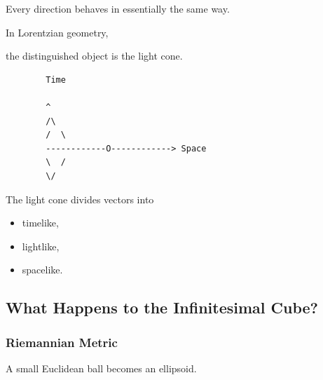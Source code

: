 \documentclass[12pt,a4paper]{article}
\theoremstyle{notespace}
\begin{document}
Every direction behaves in essentially the same way.


In Lorentzian geometry,

the distinguished object is the light cone.

\bigskip

\begin{center}
	\begin{verbatim}
		Time
		
		^
		/\
		/  \
		------------O------------> Space
		\  /
		\/
	\end{verbatim}
\end{center}

The light cone divides vectors into

\begin{itemize}
	\item timelike,
	\item lightlike,
	\item spacelike.
\end{itemize}


\subsection{What Happens to the Infinitesimal Cube?}

\subsubsection*{Riemannian Metric}

A small Euclidean ball becomes an ellipsoid.

\bigskip

\begin{center}
\end{center}
\end{document}
